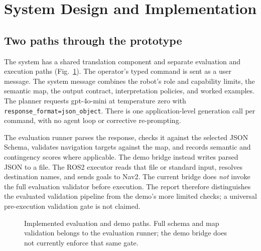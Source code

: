 \documentclass[journal]{IEEEtran}
\newcommand{\field}[1]{\texttt{#1}}
\begin{document}
\section{System Design and Implementation}
\subsection{Two paths through the prototype}
The system has a shared translation component and separate evaluation and execution paths (Fig.~\ref{fig:architecture}). The operator's typed command is sent as a user message. The system message combines the robot's role and capability limits, the semantic map, the output contract, interpretation policies, and worked examples. The planner requests gpt-4o-mini at temperature zero with \field{response\_format=json\_object}. There is one application-level generation call per command, with no agent loop or corrective re-prompting.

The evaluation runner parses the response, checks it against the selected JSON Schema, validates navigation targets against the map, and records semantic and contingency scores where applicable. The demo bridge instead writes parsed JSON to a file. The ROS2 executor reads that file or standard input, resolves destination names, and sends goals to Nav2. The current bridge does \emph{not} invoke the full evaluation validator before execution. The report therefore distinguishes the evaluated validation pipeline from the demo's more limited checks; a universal pre-execution validation gate is not claimed.

\begin{figure}[t]
\centering
{}
\caption{Implemented evaluation and demo paths. Full schema and map validation belongs to the evaluation runner; the demo bridge does not currently enforce that same gate.}
\label{fig:architecture}
\end{figure}
\end{document}
